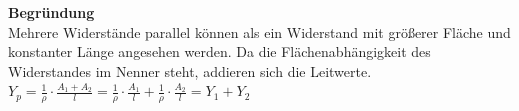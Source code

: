 					          \vspace{1em}

					          \textbf{Begründung} \\
										Mehrere Widerstände parallel können als ein Widerstand mit größerer Fläche und konstanter Länge angesehen werden. Da die Flächenabhängigkeit des Widerstandes im Nenner steht, addieren sich die Leitwerte. \\
											$\displaystyle Y_p = \frac{1}{\rho} \cdot \frac{A_1 + A_2}{l} = \frac{1}{\rho} \cdot \frac{A_1}{l}  + \frac{1}{\rho} \cdot \frac{A_2}{l}  = Y_1 + Y_2 $


										\begin{center}
										\end{center}




